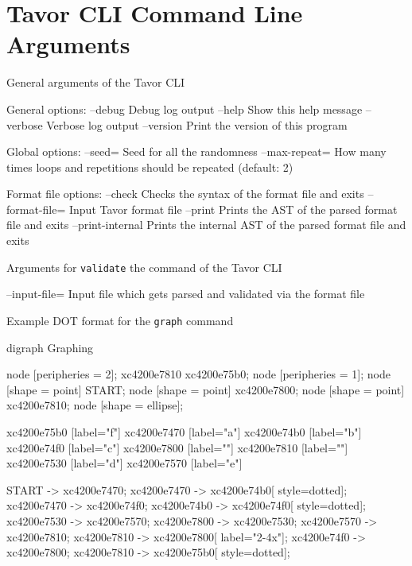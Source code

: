 \chapter{Tavor CLI Command Line Arguments}
\label{chapter:AppendixTavorCLI}

\begin{listing}
\caption{General arguments of the Tavor CLI}
\label{lst:tavor-cli-general-arguments}
\begin{textcode}
General options:
  --debug             Debug log output
  --help              Show this help message
  --verbose           Verbose log output
  --version           Print the version of this program

Global options:
  --seed=             Seed for all the randomness
  --max-repeat=       How many times loops and repetitions should be repeated (default: 2)

Format file options:
  --check             Checks the syntax of the format file and exits
  --format-file=      Input Tavor format file
  --print             Prints the AST of the parsed format file and exits
  --print-internal    Prints the internal AST of the parsed format file and exits
\end{textcode}
\end{listing}

\begin{listing}
\caption{Arguments for \texttt{validate} the command of the Tavor CLI}
\label{lst:tavor-cli-validate-options}
\begin{textcode}
      --input-file=   Input file which gets parsed and validated via the format file
\end{textcode}
\end{listing}

\begin{listing}
\caption{Example DOT format for the \texttt{graph} command}
\label{lst:tavor-cli-graph-example-dot}
\begin{textcode}
digraph Graphing {
  node [peripheries = 2]; xc4200e7810 xc4200e75b0; node [peripheries = 1];
  node [shape = point] START;
  node [shape = point] xc4200e7800;
  node [shape = point] xc4200e7810;
  node [shape = ellipse];

  xc4200e75b0 [label="f"]
  xc4200e7470 [label="a"]
  xc4200e74b0 [label="b"]
  xc4200e74f0 [label="c"]
  xc4200e7800 [label=""]
  xc4200e7810 [label=""]
  xc4200e7530 [label="d"]
  xc4200e7570 [label="e"]

  START -> xc4200e7470;
  xc4200e7470 -> xc4200e74b0[ style=dotted];
  xc4200e7470 -> xc4200e74f0;
  xc4200e74b0 -> xc4200e74f0[ style=dotted];
  xc4200e7530 -> xc4200e7570;
  xc4200e7800 -> xc4200e7530;
  xc4200e7570 -> xc4200e7810;
  xc4200e7810 -> xc4200e7800[ label="2-4x"];
  xc4200e74f0 -> xc4200e7800;
  xc4200e7810 -> xc4200e75b0[ style=dotted];
}
\end{textcode}
\end{listing}

